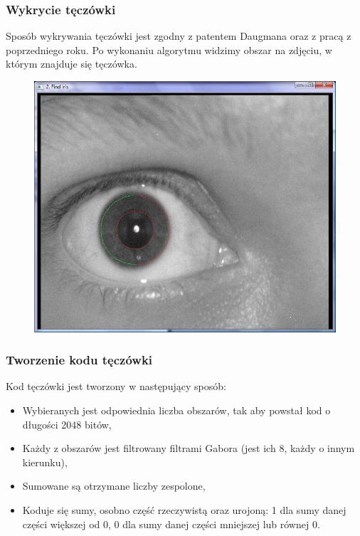 \documentclass{beamer}
\begin{document}
\begin{frame}
\frametitle{Wykrycie tęczówki}
Sposób wykrywania tęczówki jest zgodny z patentem Daugmana oraz z pracą z poprzedniego roku. Po wykonaniu algorytmu widzimy obszar na zdjęciu, w którym znajduje się tęczówka.
\begin{figure}
\begin{center}
\includegraphics[scale=0.25]{teczowka_nasza.jpg}
\end{center}
\end{figure}
\end{frame}


\begin{frame}
\frametitle{Tworzenie kodu tęczówki}
Kod tęczówki jest tworzony w następujący sposób:
\begin{itemize}
\item Wybieranych jest odpowiednia liczba obszarów, tak aby powstał kod o długości 2048 bitów,
\item Każdy z obszarów jest filtrowany filtrami Gabora (jest ich 8, każdy o innym kierunku),
\item Sumowane są otrzymane liczby zespolone,
\item Koduje się sumy, osobno część rzeczywistą oraz urojoną: 1 dla sumy danej części większej od 0, 0 dla sumy danej części mniejszej lub równej 0.
\end{itemize}
\end{frame}
\end{document}

